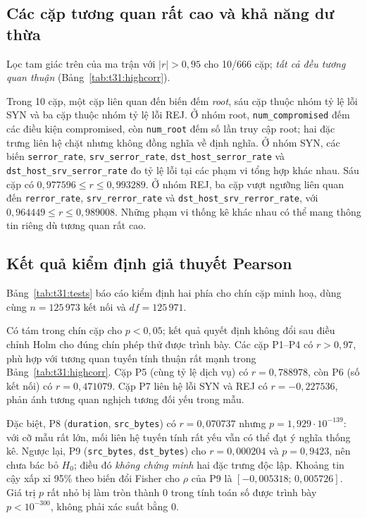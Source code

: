 \documentclass[../main.tex]{subfiles}
\begin{document}
\subsection{Các cặp tương quan rất cao và khả năng dư thừa}
Lọc tam giác trên của ma trận với $|r|>0{,}95$ cho 10/666 cặp;
\emph{tất cả đều tương quan thuận} (Bảng~\ref{tab:t31:highcorr}).

Trong 10 cặp, một cặp liên quan đến biến đếm \emph{root}, sáu cặp thuộc
nhóm tỷ lệ lỗi SYN và ba cặp thuộc nhóm tỷ lệ lỗi REJ. Ở nhóm root,
\texttt{num\_compromised} đếm các điều kiện compromised, còn
\texttt{num\_root} đếm số lần truy cập root; hai đặc trưng liên hệ chặt
nhưng không đồng nghĩa về định nghĩa. Ở nhóm SYN, các biến
\nolinkurl{serror_rate}, \nolinkurl{srv_serror_rate},
\nolinkurl{dst_host_serror_rate} và \nolinkurl{dst_host_srv_serror_rate}
đo tỷ lệ lỗi tại các phạm vi tổng hợp khác nhau. Sáu cặp có
$0{,}977596\leq r\leq0{,}993289$. Ở nhóm REJ, ba cặp vượt ngưỡng
liên quan đến \nolinkurl{rerror_rate}, \nolinkurl{srv_rerror_rate} và
\nolinkurl{dst_host_srv_rerror_rate}, với
$0{,}964449\leq r\leq0{,}989008$. Những phạm vi thống kê khác nhau có
thể mang thông tin riêng dù tương quan rất cao.

\subsection{Kết quả kiểm định giả thuyết Pearson}
Bảng~\ref{tab:t31:tests} báo cáo kiểm định hai phía cho chín cặp minh hoạ,
dùng cùng $n=125\,973$ kết nối và $df=125\,971$.

Có tám trong chín cặp cho $p<0{,}05$; kết quả quyết định không đổi sau
điều chỉnh Holm cho đúng chín phép thử được trình bày. Các cặp P1--P4 có
$r>0{,}97$, phù hợp với tương quan tuyến tính thuận rất mạnh trong
Bảng~\ref{tab:t31:highcorr}. Cặp P5 (cùng tỷ lệ dịch vụ) có
$r=0{,}788978$, còn P6 (số kết nối) có $r=0{,}471079$. Cặp P7
liên hệ lỗi SYN và REJ có $r=-0{,}227536$, phản ánh tương quan
nghịch tương đối yếu trong mẫu.

Đặc biệt, P8 (\texttt{duration}, \texttt{src\_bytes}) có
$r=0{,}070737$ nhưng $p=1{,}929\cdot10^{-139}$: với cỡ mẫu rất lớn,
mối liên hệ tuyến tính rất yếu vẫn có thể đạt ý nghĩa thống kê.
Ngược lại, P9 (\texttt{src\_bytes}, \texttt{dst\_bytes}) cho
$r=0{,}000204$ và $p=0{,}9423$, nên chưa bác bỏ $H_0$;
điều đó \emph{không chứng minh} hai đặc trưng độc lập. Khoảng tin cậy
xấp xỉ 95\% theo biến đổi Fisher cho $\rho$ của P9 là
$[-0{,}005318;\,0{,}005726]$. Giá trị $p$ rất nhỏ bị làm tròn thành 0
trong tính toán số được trình bày $p<10^{-300}$, không phải xác suất bằng 0.
\end{document}
